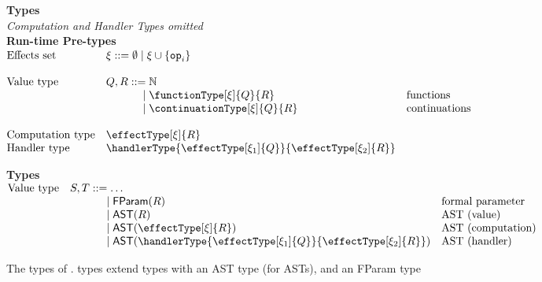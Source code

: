 \begin{figure}[t]
  \begin{core-desc}
    {\large {\textbf{Types}}}\\
    \textit{Computation and Handler Types omitted}\\

    \textbf{Run-time Pre-types}\\
    $\begin{array}{@{}lllr}
    \text{Effects set} & \xi ::= \emptyset \mid \xi \cup \{ \texttt{op}_i \} \\
    \\
    \text{Value type} & Q,R ::= \mathbb{N} & \\
                              &\quad\quad\quad\,\, \mid \functionType[\xi]{Q}{R} & \text{functions}\\
                              &\quad\quad\quad\,\, \mid \continuationType[\xi]{Q}{R} & \text{continuations}\\ \\
    \text{Computation type} & \effectType[\xi]{R} \\
    \text{Handler type} & \handlerType{\effectType[\xi_1]{Q}}{\effectType[\xi_2]{R}}
    \end{array}$
    
    \vspace{4mm}

    \textbf{Types}\\
  $\begin{array}{@{}lllr}
    \text{Value type} & S, T ::= \ldots\\
                              &\quad\quad\quad\,\, \mid \textsf{FParam}(R) & \text{formal parameter}\\
                              &\quad\quad\quad\,\, \mid \textsf{AST}(R) & \text{AST (value)}\\
                              &\quad\quad\quad\,\, \mid \textsf{AST}(\effectType[\xi]{R}) & \text{AST (computation)}\\
                              &\quad\quad\quad\,\, \mid \textsf{AST}(\handlerType{\effectType[\xi_1]{Q}}{\effectType[\xi_2]{R}}) & \text{AST (handler)}\\
  \end{array}$
  \end{core-desc}
  \caption{The types of \coreLang{}. \coreLang{} types extend \efflang{} types with an \textsf{AST} type (for ASTs), and an \textsf{FParam} type}%
  \label{fig:core-types}
\end{figure}

